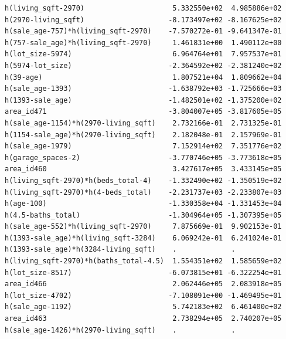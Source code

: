 \documentclass[
]{article}
\begin{document}
\begin{verbatim}
h(living_sqft-2970)                     5.332550e+02  4.985886e+02
h(2970-living_sqft)                    -8.173497e+02 -8.167625e+02
h(sale_age-757)*h(living_sqft-2970)    -7.570272e-01 -9.641347e-01
h(757-sale_age)*h(living_sqft-2970)     1.461831e+00  1.490112e+00
h(lot_size-5974)                        6.964764e+01  7.957537e+01
h(5974-lot_size)                       -2.364592e+02 -2.381240e+02
h(39-age)                               1.807521e+04  1.809662e+04
h(sale_age-1393)                       -1.638792e+03 -1.725666e+03
h(1393-sale_age)                       -1.482501e+02 -1.375200e+02
area_id471                             -3.804007e+05 -3.817605e+05
h(sale_age-1154)*h(2970-living_sqft)    2.732166e-01  2.731325e-01
h(1154-sale_age)*h(2970-living_sqft)    2.182048e-01  2.157969e-01
h(sale_age-1979)                        7.152914e+02  7.351776e+02
h(garage_spaces-2)                     -3.770746e+05 -3.773618e+05
area_id460                              3.427617e+05  3.433145e+05
h(living_sqft-2970)*h(beds_total-4)    -1.332490e+02 -1.350519e+02
h(living_sqft-2970)*h(4-beds_total)    -2.231737e+03 -2.233807e+03
h(age-100)                             -1.330358e+04 -1.331453e+04
h(4.5-baths_total)                     -1.304964e+05 -1.307395e+05
h(sale_age-552)*h(living_sqft-2970)     7.875669e-01  9.902153e-01
h(1393-sale_age)*h(living_sqft-3284)    6.069242e-01  6.241024e-01
h(1393-sale_age)*h(3284-living_sqft)    .             .           
h(living_sqft-2970)*h(baths_total-4.5)  1.554351e+02  1.585659e+02
h(lot_size-8517)                       -6.073815e+01 -6.322254e+01
area_id466                              2.062446e+05  2.083918e+05
h(lot_size-4702)                       -7.108091e+00 -1.469495e+01
h(sale_age-1192)                        5.742183e+02  6.461400e+02
area_id463                              2.738294e+05  2.740207e+05
h(sale_age-1426)*h(2970-living_sqft)    .             .           
                                                                  

\end{verbatim}
\end{document}

